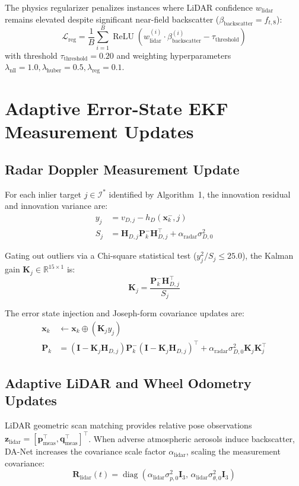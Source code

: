 \documentclass[lettersize,journal]{IEEEtran}
\begin{document}
The physics regularizer penalizes instances where LiDAR confidence $w_{\mathrm{lidar}}$ remains elevated despite significant near-field backscatter ($\beta_{\mathrm{backscatter}} = f_{t, 8}$):
\begin{equation}
\mathcal{L}_{\mathrm{reg}} = \frac{1}{B} \sum_{i=1}^B \operatorname{ReLU}(w_{\mathrm{lidar}}^{(i)} \cdot \beta_{\mathrm{backscatter}}^{(i)} - \tau_{\mathrm{threshold}})
\end{equation}
with threshold $\tau_{\mathrm{threshold}} = 0.20$ and weighting hyperparameters $\lambda_{\mathrm{nll}} = 1.0, \lambda_{\mathrm{huber}} = 0.5, \lambda_{\mathrm{reg}} = 0.1$.

\section{Adaptive Error-State EKF Measurement Updates}

\subsection{Radar Doppler Measurement Update}
For each inlier target $j \in \mathcal{I}^*$ identified by Algorithm~1, the innovation residual and innovation variance are:
\begin{align}
y_j &= v_{D, j} - h_D(\mathbf{x}_k^-, j) \\
S_j &= \mathbf{H}_{D, j} \mathbf{P}_k^- \mathbf{H}_{D, j}^\top + \alpha_{\mathrm{radar}} \sigma_{D, 0}^2
\end{align}

Gating out outliers via a Chi-square statistical test ($y_j^2 / S_j \le 25.0$), the Kalman gain $\mathbf{K}_j \in \mathbb{R}^{15 \times 1}$ is:
\begin{equation}
\mathbf{K}_j = \frac{\mathbf{P}_k^- \mathbf{H}_{D, j}^\top}{S_j}
\end{equation}

The error state injection and Joseph-form covariance updates are:
\begin{align}
\mathbf{x}_k &\leftarrow \mathbf{x}_k \oplus (\mathbf{K}_j y_j) \\
\mathbf{P}_k &= (\mathbf{I} - \mathbf{K}_j \mathbf{H}_{D, j}) \mathbf{P}_k^- (\mathbf{I} - \mathbf{K}_j \mathbf{H}_{D, j})^\top + \alpha_{\mathrm{radar}} \sigma_{D, 0}^2 \mathbf{K}_j \mathbf{K}_j^\top
\end{align}

\subsection{Adaptive LiDAR and Wheel Odometry Updates}
LiDAR geometric scan matching provides relative pose observations $\mathbf{z}_{\mathrm{lidar}} = [\mathbf{p}_{\mathrm{meas}}^\top, \mathbf{q}_{\mathrm{meas}}^\top]^\top$. 
When adverse atmospheric aerosols induce backscatter, DA-Net increases the covariance scale factor $\alpha_{\mathrm{lidar}}$, scaling the measurement covariance:
\begin{equation}
\mathbf{R}_{\mathrm{lidar}}(t) = \operatorname{diag}\left( \alpha_{\mathrm{lidar}} \sigma_{p, 0}^2 \mathbf{I}_3, \, \alpha_{\mathrm{lidar}} \sigma_{\theta, 0}^2 \mathbf{I}_3 \right)
\end{equation}
\end{document}
